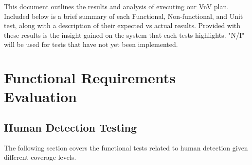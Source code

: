 \documentclass[12pt, titlepage]{article}
\begin{document}
\newpage


This document outlines the results and analysis of executing our VnV plan. Included below is a brief summary of each Functional, Non-functional, and Unit test, along with a description of their expected vs actual results. Provided with these results is the insight gained on the system that each tests highlights. "N/I" will be used for tests that have not yet been implemented.  

\section{Functional Requirements Evaluation}

\subsection{Human Detection Testing}
The following section covers the functional tests related to human detection given different coverage levels.
\end{document}

